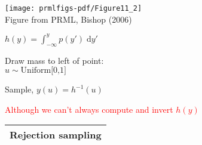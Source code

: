 \documentclass[25pt,landscape]{foils}
\newcommand{\Red}{\textcolor{red}}
\newcommand{\Gray}{\textcolor{mygray}}
\newcommand{\myfoilhead}[1]{
\newpage
\vspace*{-1cm}
\Gray{
\begin{tabular*}{\textwidth}{l}
{\bf \Huge #1} \\
\bottomrule
\end{tabular*}}}
\newcommand{\D}{\mathcal{D}}
\newcommand{\Z}{\mathcal{Z}}
\begin{document}
\begin{minipage}{0.6\linewidth}
\texttt{[image: prmlfigs-pdf/Figure11\_2]}\\[-1cm]
\Gray{\tiny Figure from PRML, Bishop (2006)}
\end{minipage}
\begin{minipage}{0.4\linewidth}

$h(y)=\int_{-\infty}^y p(y') \;\mathrm{d}y'$\\

\bigskip
\bigskip

Draw mass to left of point:\\
\hspace*{1cm}$u\sim\mbox{Uniform[0,1]}$\\

\bigskip

Sample, $y(u) = h^{-1}(u)$
\end{minipage}

\vfill
\vfill

\Red{Although we can't always compute and invert $h(y)$}

\vspace*{-0.5cm}


%
%
%
%
%
\myfoilhead{Rejection sampling}

\vspace*{1cm}

\end{document}
